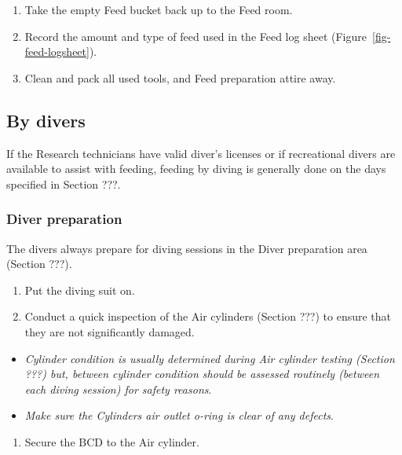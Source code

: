 \documentclass[
  12pt,
]{report}
\providecommand{\tightlist}{%
  \setlength{\itemsep}{0pt}\setlength{\parskip}{0pt}}\usepackage{longtable,booktabs,array}
\begin{document}
\begin{enumerate}
\def\labelenumi{\arabic{enumi}.}
\setcounter{enumi}{20}
\tightlist
\item
  Take the empty Feed bucket back up to the Feed room.
\item
  Record the amount and type of feed used in the Feed log sheet
  (Figure~\ref{fig-feed-logsheet}).
\item
  Clean and pack all used tools, and Feed preparation attire away.
\end{enumerate}

\hypertarget{by-divers}{%
\subsection{By divers}\label{by-divers}}

If the Research technicians have valid diver's licenses or if
recreational divers are available to assist with feeding, feeding by
diving is generally done on the days specified in Section ???.

\hypertarget{diver-preparation}{%
\subsubsection{Diver preparation}\label{diver-preparation}}

The divers always prepare for diving sessions in the Diver preparation
area (Section ???).

\begin{enumerate}
\def\labelenumi{\arabic{enumi}.}
\tightlist
\item
  Put the diving suit on.
\item
  Conduct a quick inspection of the Air cylinders (Section ???) to
  ensure that they are not significantly damaged.
\end{enumerate}

\begin{itemize}
\tightlist
\item
  \emph{Cylinder condition is usually determined during Air cylinder
  testing (Section ???) but, between cylinder condition should be
  assessed routinely (between each diving session) for safety reasons}.
\item
  \emph{Make sure the Cylinders air outlet o-ring is clear of any
  defects}.
\end{itemize}

\begin{enumerate}
\def\labelenumi{\arabic{enumi}.}
\setcounter{enumi}{2}
\tightlist
\item
  Secure the BCD to the Air cylinder.
\end{enumerate}
\end{document}
